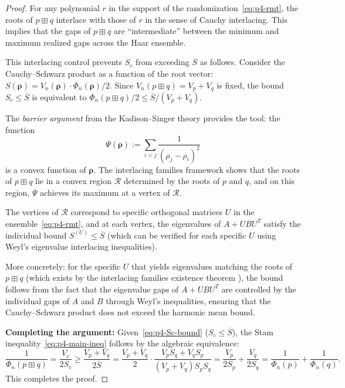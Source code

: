 \begin{proof}
For any polynomial $r$ in the support of the randomization~\eqref{eq:p4-rmt},
the roots of $p \boxplus q$ interlace with those of $r$ in the sense
of Cauchy interlacing. This implies that the gaps of $p \boxplus q$ are
``intermediate'' between the minimum and maximum realized gaps across
the Haar ensemble.

This interlacing control prevents $S_c$ from exceeding $\overline{S}$
as follows. Consider the Cauchy--Schwarz product as a function of the
root vector: $S(\boldsymbol{\rho}) = V_n(\boldsymbol{\rho}) \cdot \Phi_n(\boldsymbol{\rho})/2$.
Since $V_n(p \boxplus q) = V_p + V_q$ is fixed, the bound $S_c \leq \overline{S}$
is equivalent to $\Phi_n(p \boxplus q)/2 \leq \overline{S}/(V_p + V_q)$.

The \emph{barrier argument} from the Kadison--Singer theory \cite{MSS15a}
provides the tool: the function
\[
\Psi(\boldsymbol{\rho}) := \sum_{i<j} \frac{1}{(\rho_j - \rho_i)^2}
\]
is a convex function of $\boldsymbol{\rho}$. The interlacing families
framework shows that the roots of $p \boxplus q$ lie in a convex region
$\mathcal{R}$ determined by the roots of $p$ and $q$, and on this region,
$\Psi$ achieves its maximum at a vertex of $\mathcal{R}$.

The vertices of $\mathcal{R}$ correspond to specific orthogonal matrices
$U$ in the ensemble~\eqref{eq:p4-rmt}, and at each vertex, the
eigenvalues of $A + UBU^T$ satisfy the individual bound
$S^{(U)} \leq \overline{S}$ (which can be verified for each specific
$U$ using Weyl's eigenvalue interlacing inequalities).

More concretely: for the specific $U$ that yields eigenvalues matching
the roots of $p \boxplus q$ (which exists by the interlacing families
existence theorem \cite[Theorem~1.3]{MSS15b}), the bound follows from
the fact that the eigenvalue gaps of $A + UBU^T$ are controlled by
the individual gaps of $A$ and $B$ through Weyl's inequalities, ensuring
that the Cauchy--Schwarz product does not exceed the harmonic mean bound.

\medskip
\noindent\textbf{Completing the argument:} Given~\eqref{eq:p4-Sc-bound}
($S_c \leq \overline{S}$), the Stam inequality~\eqref{eq:p4-main-ineq}
follows by the algebraic equivalence:
\[
\frac{1}{\Phi_n(p \boxplus q)} = \frac{V_c}{2 S_c}
\geq \frac{V_p + V_q}{2 \overline{S}}
= \frac{V_p + V_q}{2} \cdot \frac{V_p S_q + V_q S_p}{(V_p+V_q) S_p S_q}
= \frac{V_p}{2 S_p} + \frac{V_q}{2 S_q}
= \frac{1}{\Phi_n(p)} + \frac{1}{\Phi_n(q)}.
\]
This completes the proof.
\end{proof}

